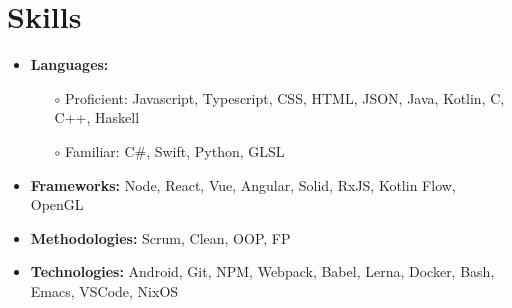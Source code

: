 \documentclass[11pt, a4paper]{article}
\begin{document}
\vspace{-0.2in}

\section*{Skills}
\vspace{-0.05in}

\begin{itemize}
  \item {\bf Languages:}
        \vspace{-0.1in}
        \begin{itemize}
          \item[$\circ$] Proficient: Javascript, Typescript, CSS, HTML, JSON, Java, Kotlin, C, C++, Haskell
            \vspace{-0.05in}
          \item[$\circ$] Familiar: C\#, Swift, Python, GLSL
        \end{itemize}
        \vspace{-0.15in}
  \item {\bf Frameworks:} Node, React, Vue, Angular, Solid, RxJS, Kotlin Flow, OpenGL
        \vspace{-0.1in}
  \item {\bf Methodologies:} Scrum, Clean, OOP, FP
        \vspace{-0.1in}
  \item {\bf Technologies:} Android, Git, NPM, Webpack, Babel, Lerna, Docker, Bash, Emacs, VSCode, NixOS
\end{itemize}
\end{document}
